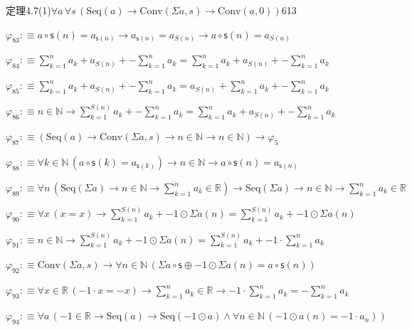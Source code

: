 \begin{fullproof}{定理4.7(1)}{$\forall a\,\forall s\,(\mathrm{Seq}(a) \to \mathrm{Conv}(\Sigma a,s) \to \mathrm{Conv}(a,0))$}{613}
\begin{abbrevlist}
\item $\varphi_{83} :\equiv a \circ \mathsf{s}(n) = a_{\mathsf{s}(n)} \to a_{\mathsf{s}(n)} = a_{S(n)} \to a \circ \mathsf{s}(n) = a_{S(n)}$
\item $\varphi_{84} :\equiv {\textstyle\sum_{k=1}^{n} a_{k}} + a_{S(n)} + -{\textstyle\sum_{k=1}^{n} a_{k}} = {\textstyle\sum_{k=1}^{n} a_{k}} + a_{S(n)} + -{\textstyle\sum_{k=1}^{n} a_{k}}$
\item $\varphi_{85} :\equiv {\textstyle\sum_{k=1}^{n} a_{k}} + a_{S(n)} + -{\textstyle\sum_{k=1}^{n} a_{k}} = a_{S(n)} + {\textstyle\sum_{k=1}^{n} a_{k}} + -{\textstyle\sum_{k=1}^{n} a_{k}}$
\item $\varphi_{86} :\equiv n \in \mathbb{N} \to {\textstyle\sum_{k=1}^{S(n)} a_{k}} + -{\textstyle\sum_{k=1}^{n} a_{k}} = {\textstyle\sum_{k=1}^{n} a_{k}} + a_{S(n)} + -{\textstyle\sum_{k=1}^{n} a_{k}}$
\item $\varphi_{87} :\equiv (\mathrm{Seq}(a) \to \mathrm{Conv}(\Sigma a,s) \to n \in \mathbb{N} \to n \in \mathbb{N}) \to \varphi_{5}$
\item $\varphi_{88} :\equiv \forall k \in \mathbb{N}\,(a \circ \mathsf{s}(k) = a_{\mathsf{s}(k)}) \to n \in \mathbb{N} \to a \circ \mathsf{s}(n) = a_{\mathsf{s}(n)}$
\item $\varphi_{89} :\equiv \forall n\,(\mathrm{Seq}(\Sigma a) \to n \in \mathbb{N} \to {\textstyle\sum_{k=1}^{n} a_{k}} \in \mathbb{R}) \to \mathrm{Seq}(\Sigma a) \to n \in \mathbb{N} \to {\textstyle\sum_{k=1}^{n} a_{k}} \in \mathbb{R}$
\item $\varphi_{90} :\equiv \forall x\,(x = x) \to {\textstyle\sum_{k=1}^{S(n)} a_{k}} + -1 \odot \Sigma a(n) = {\textstyle\sum_{k=1}^{S(n)} a_{k}} + -1 \odot \Sigma a(n)$
\item $\varphi_{91} :\equiv n \in \mathbb{N} \to {\textstyle\sum_{k=1}^{S(n)} a_{k}} + -1 \odot \Sigma a(n) = {\textstyle\sum_{k=1}^{S(n)} a_{k}} + -1 \cdot {\textstyle\sum_{k=1}^{n} a_{k}}$
\item $\varphi_{92} :\equiv \mathrm{Conv}(\Sigma a,s) \to \forall n \in \mathbb{N}\,(\Sigma a \circ \mathsf{s} \oplus -1 \odot \Sigma a(n) = a \circ \mathsf{s}(n))$
\item $\varphi_{93} :\equiv \forall x \in \mathbb{R}\,(-1 \cdot x = -x) \to {\textstyle\sum_{k=1}^{n} a_{k}} \in \mathbb{R} \to -1 \cdot {\textstyle\sum_{k=1}^{n} a_{k}} = -{\textstyle\sum_{k=1}^{n} a_{k}}$
\item $\varphi_{94} :\equiv \forall a\,(-1 \in \mathbb{R} \to \mathrm{Seq}(a) \to \mathrm{Seq}(-1 \odot a) \land \forall n \in \mathbb{N}\,(-1 \odot a(n) = -1 \cdot a_{n}))$

\end{abbrevlist}
\end{fullproof}
